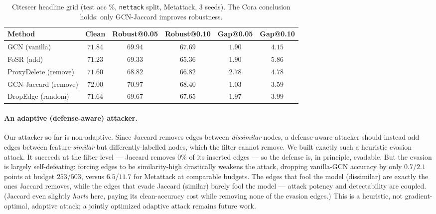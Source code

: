 \documentclass[11pt]{article}
\begin{document}
\begin{table}[t]
\centering\small
\begin{tabular}{@{}lccccc@{}}
\toprule
\textbf{Method} & \textbf{Clean} & \textbf{Robust@0.05} & \textbf{Robust@0.10} & \textbf{Gap@0.05} & \textbf{Gap@0.10} \\
\midrule
GCN (vanilla)        & $71.84$ & $69.94$ & $67.69$ & $1.90$ & $4.15$ \\
FoSR (add)           & $71.23$ & $69.33$ & $65.36$ & $1.90$ & $5.86$ \\
ProxyDelete (remove) & $71.60$ & $68.82$ & $66.82$ & $2.78$ & $4.78$ \\
GCN-Jaccard (remove) & $72.00$ & $\mathbf{70.97}$ & $\mathbf{68.40}$ & $\mathbf{1.03}$ & $\mathbf{3.59}$ \\
DropEdge (random)    & $71.64$ & $69.67$ & $67.65$ & $1.97$ & $3.99$ \\
\bottomrule
\end{tabular}
\caption{Citeseer headline grid (test acc \%, \texttt{nettack} split, Metattack, 3 seeds). The Cora
conclusion holds: only GCN-Jaccard improves robustness.}
\label{tab:citeseer}
\end{table}

\paragraph{An adaptive (defense-aware) attacker.} Our attacker so far is non-adaptive. Since Jaccard
removes edges between \emph{dissimilar} nodes, a defense-aware attacker should instead add edges between
feature-\emph{similar} but differently-labelled nodes, which the filter cannot remove. We built exactly
such a heuristic evasion attack. It succeeds at the filter level --- Jaccard removes $0\%$ of its inserted
edges --- so the defense is, in principle, evadable. But the evasion is largely self-defeating: forcing
edges to be similarity-high drastically weakens the attack, dropping vanilla-GCN accuracy by only
$0.7$/$2.1$ points at budget $253$/$503$, versus $6.5$/$11.7$ for Metattack at comparable budgets. The
edges that fool the model (dissimilar) are exactly the ones Jaccard removes, while the edges that evade
Jaccard (similar) barely fool the model --- attack potency and detectability are coupled. (Jaccard even
slightly \emph{hurts} here, paying its clean-accuracy cost while removing none of the evasion edges.) This
is a heuristic, not gradient-optimal, adaptive attack; a jointly optimized adaptive attack remains future
work.
\end{document}
